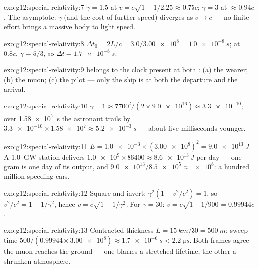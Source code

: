 \begin{solution}{exo:g12:special-relativity:7}
$\gamma = 1.5$ at $v = c\sqrt{1 - 1/2.25} \approx 0.75c$;
$\gamma = 3$ at $\approx 0.94c$. The asymptote: $\gamma$ (and the
 cost of further speed) diverges as $v \to c$ --- no finite
effort brings a massive body to light speed.
\end{solution}

\begin{solution}{exo:g12:special-relativity:8}
$\Delta t_0 = 2L/c = 3.0/\num{3.00e8} = \qty{1.0e-8}{s}$; at $0.8c$,
$\gamma = 5/3$, so $\Delta t = \qty{1.7e-8}{s}$.
\end{solution}

\begin{solution}{exo:g12:special-relativity:9}
 belongs to the clock present at both : (a) the
wearer; (b) the muon; (c) the pilot --- only the ship is at both the
departure and the arrival.
\end{solution}

\begin{solution}{exo:g12:special-relativity:10}
$\gamma - 1 \approx 7700^2/(2 \times \num{9.0e16}) \approx
\num{3.3e-10}$; over \qty{1.58e7}{s} the astronaut trails by
$\num{3.3e-10} \times \num{1.58e7} \approx \qty{5.2e-3}{s}$ --- about
five milliseconds younger.
\end{solution}

\begin{solution}{exo:g12:special-relativity:11}
$E = \num{1.0e-3} \times (\num{3.00e8})^2 = \qty{9.0e13}{J}$. A
\qty{1.0}{GW} station delivers $\num{1.0e9} \times 86400 \approx
\qty{8.6e13}{J}$ per day --- one gram is one day of its output, and
$\num{9.0e13}/\num{8.5e5} \approx \num{e8}$: a hundred million
speeding cars.
\end{solution}

\begin{solution}{exo:g12:special-relativity:12}
Square and invert: $\gamma^2(1 - v^2/c^2) = 1$, so
$v^2/c^2 = 1 - 1/\gamma^2$, hence $v = c\sqrt{1 - 1/\gamma^2}$. For
$\gamma = 30$: $v = c\sqrt{1 - 1/900} = 0.99944c$.
\end{solution}

\begin{solution}{exo:g12:special-relativity:13}
Contracted thickness $L = \qty{15}{km}/30 = \qty{500}{m}$; sweep time
$500/(0.99944 \times \num{3.00e8}) \approx \qty{1.7e-6}{s} <
\qty{2.2}{\micro s}$. Both frames agree the muon reaches the ground ---
one blames a stretched lifetime, the other a shrunken atmosphere.
\end{solution}


